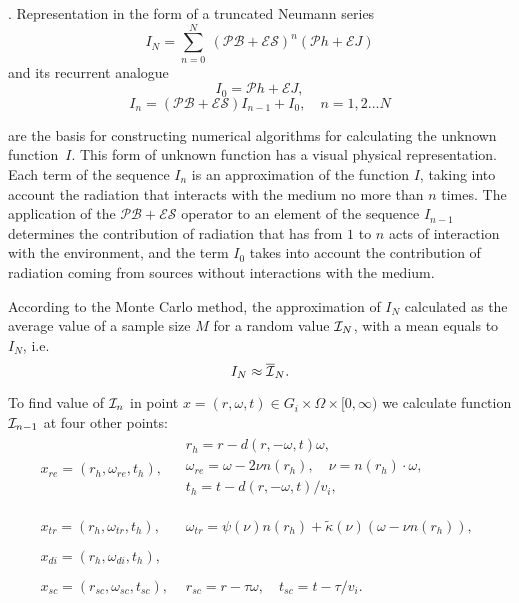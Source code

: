 \documentclass[12pt,reqno]{report}
\begin{document}
\cite{34}. 
Representation in the form of a truncated Neumann series
\begin{equation}
I_N = \sum_{n=0}^{N}\ (\mathcal{PB} + \mathcal{ES})^n (\mathcal P h
+ \mathcal E J)
\end{equation}
and its recurrent analogue
\begin{equation}
I_0 = \mathcal P h + \mathcal E J,
\end{equation}
\begin{equation}
I_n = (\mathcal{PB} + \mathcal{ES}) I_{n-1} + I_0,\quad n = 1, 2 \dots N
\end{equation}


are the basis for constructing numerical algorithms for calculating the unknown function~$I$. 
This form of unknown function has a visual physical representation.
Each term of the sequence $I_n$ is an approximation of the function $I$, 
taking into account the radiation that interacts with the medium no more than $n$ times.
The application of the $\mathcal{PB} + \mathcal{ES}$ operator to an element of the sequence $I_ {n-1}$ 
determines the contribution of radiation that has from $1$ to $n$ acts of interaction with the environment, 
and the term $I_0$ takes into account the contribution of radiation coming from sources without 
interactions with the medium.

According to the Monte Carlo method, the approximation of $I_N$
calculated as the average value of a sample size $M$ for a random
value ${\cal I}_N$, with a mean equals to $I_N$, i.e.
\begin{equation}
I_N \approx \overline{\cal I}_{N}.
\end{equation}

To find value of ${\cal I}_{n}$ in point
$x=(r,\omega,t)\in G_i \times \Omega \times [0,\infty)$
we calculate function ${\cal I}_{n-1}$ at four other points:
\begin{equation}
\begin{array}{ll}
  x_{re}=(r_h,\omega_{re}, t_h), &
  \begin{array}{l}
    r_h = r - d(r,-\omega,t)\omega,\\
    \omega_{re} = \omega - 2\nu n(r_h),  \quad  \nu=n(r_h) \cdot \omega,\\
    t_h = t - d(r,-\omega,t)/v_i, \\
  \end{array}%
\\
\\
  x_{tr}=(r_h,\omega_{tr},t_h), &
  \begin{array}{l}
    \omega_{tr}=\psi (\nu)
    n(r_h) + \widetilde{\kappa}(\nu)( \omega -  \nu n(r_h)),
  \end{array}
\\
\\
  x_{di}=(r_{h},\omega_{di},t_{h}), &
\\
\\
  x_{sc}=(r_{sc},\omega_{sc},t_{sc}), &
  \begin{array}{l}
    r_{sc}=r-\tau \omega, \quad
    t_{sc}=t-\tau/v_i.
  \end{array}
\end{array}
\end{equation}
\end{document}

